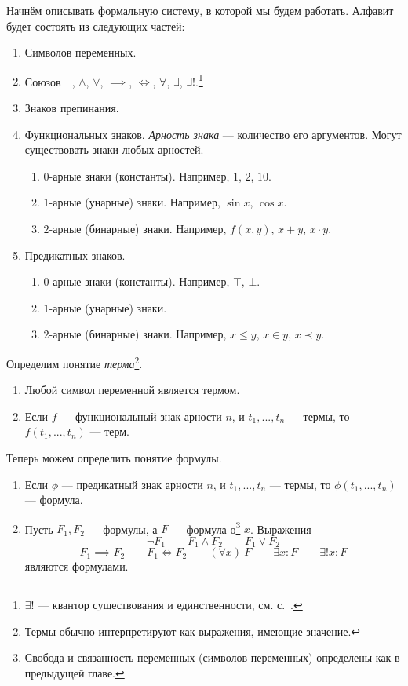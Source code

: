 Начнём описывать формальную систему, в которой мы будем работать.
Алфавит будет состоять из следующих частей:
\begin{enumerate}
	\item{}Символов переменных.
	\item{}Союзов $\lnot$, $\land$, $\lor$, $\implies$, $\iff$,
	$\forall$, $\exists$, $\exists!$.\footnote{
		$\exists!$ --- квантор существования и единственности,
		см. с.~\pageref{page:exists_only}.
	}
	\item{}Знаков препинания.
	\item{}Функциональных знаков.
	{\it Арность знака} --- количество его аргументов.
	Могут существовать знаки любых арностей.
	\begin{enumerate}
		\item{}$0$-арные знаки (константы). Например, $1$, $2$, $10$.
		\item{}$1$-арные (унарные) знаки. Например, $\sin x$, $\cos x$.
		\item{}$2$-арные (бинарные) знаки. Например, $f(x,y)$, $x+y$, $x\cdot y$.
	\end{enumerate}
	\item{}Предикатных знаков.
	\begin{enumerate}
		\item{}$0$-арные знаки (константы). Например, $\top$, $\bot$.
		\item{}$1$-арные (унарные) знаки.
		\item{}$2$-арные (бинарные) знаки. Например, $x\leq y$, $x\in y$, $x\prec y$.
	\end{enumerate}
\end{enumerate}

Определим понятие {\it терма}\footnote{
	Термы обычно интерпретируют как выражения,
	имеющие значение.}.
\begin{enumerate}
	\item{}Любой символ переменной является термом.
	\item{}Если $f$ --- функциональный знак арности $n$, и $t_1,...,t_{n}$ --- термы,
	то $f(t_1,...,t_{n})$ --- терм.
\end{enumerate}

Теперь можем определить понятие формулы.
\begin{enumerate}
	\item{}Если $\phi$ --- предикатный знак арности $n$, и $t_1,...,t_{n}$ --- термы,
	то $\phi(t_1,...,t_{n})$ --- формула.
	\item{}Пусть $F_1,F_2$ --- формулы, а $F$ --- формула о\footnote{
		Свобода и связанность переменных (символов переменных) определены
		как в предыдущей главе.
	} $x$. Выражения
	\[
		\lnot F_1\qquad F_1\land F_2\qquad F_1\lor F_2
	\]
	\[
		F_1\implies F_2\qquad F_1\iff F_2\qquad (\forall x)~F\qquad
		\exists x:F\qquad \exists! x:F
	\]
	являются формулами.
\end{enumerate}

